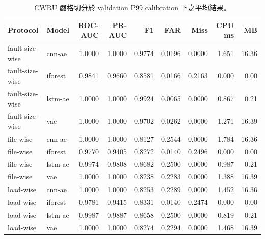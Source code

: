 \begin{table}[H]
\caption{CWRU 嚴格切分於 validation P99 calibration 下之平均結果。}
\label{tab:cwru_strict}
\centering
\scriptsize
\begin{tabular}{llrrrrrrr}
\toprule
Protocol & Model & ROC-AUC & PR-AUC & F1 & FAR & Miss & CPU ms & MB \\
\midrule
fault-size-wise & cnn-ae & 1.0000 & 1.0000 & 0.9774 & 0.0196 & 0.0000 & 1.651 & 16.36 \\
fault-size-wise & iforest & 0.9841 & 0.9660 & 0.8581 & 0.0166 & 0.2163 & 0.000 & 0.00 \\
fault-size-wise & lstm-ae & 1.0000 & 1.0000 & 0.9924 & 0.0065 & 0.0000 & 0.867 & 0.21 \\
fault-size-wise & vae & 1.0000 & 1.0000 & 0.9702 & 0.0262 & 0.0000 & 1.271 & 16.39 \\
file-wise & cnn-ae & 1.0000 & 1.0000 & 0.8127 & 0.2544 & 0.0000 & 1.784 & 16.36 \\
file-wise & iforest & 0.9770 & 0.9405 & 0.8272 & 0.0140 & 0.2496 & 0.000 & 0.00 \\
file-wise & lstm-ae & 0.9974 & 0.9808 & 0.8682 & 0.2500 & 0.0000 & 0.987 & 0.21 \\
file-wise & vae & 1.0000 & 1.0000 & 0.8238 & 0.2283 & 0.0000 & 1.388 & 16.39 \\
load-wise & cnn-ae & 1.0000 & 1.0000 & 0.8253 & 0.2289 & 0.0000 & 1.452 & 16.36 \\
load-wise & iforest & 0.9781 & 0.9415 & 0.8331 & 0.0140 & 0.2474 & 0.000 & 0.00 \\
load-wise & lstm-ae & 0.9987 & 0.9887 & 0.8658 & 0.2500 & 0.0000 & 0.819 & 0.21 \\
load-wise & vae & 1.0000 & 1.0000 & 0.8274 & 0.2294 & 0.0000 & 1.468 & 16.39 \\
\bottomrule
\end{tabular}
\end{table}
